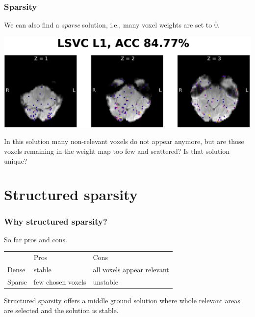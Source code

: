 \documentclass[11pt]{beamer}
\begin{document}
\begin{frame}
    \frametitle{Sparsity}

    We can also find a \emph{sparse} solution, i.e., many voxel weights are set
    to 0.

    \begin{center}
        \includegraphics[scale=0.7]{figures/lsvc_l1-axial.png}
    \end{center}

    In this solution many non-relevant voxels do not appear anymore, but are
    those voxels remaining in the weight map too few and scattered? Is that
    solution unique?

\end{frame}

\section{Structured sparsity}
\label{sec:Structured sparsity}

\begin{frame}
    \frametitle{Why structured sparsity?}

    So far pros and cons.

    \begin{center}
        \begin{tabular}[h]{@{}lll@{}}
            & Pros & Cons \\
            \cmidrule(r){2-3}
            Dense & stable & all voxels appear relevant \\
            Sparse & few chosen voxels & unstable
        \end{tabular}
    \end{center} 
    
    \pause

    Structured sparsity offers a middle ground solution where whole relevant
    areas are selected and the solution is stable.

\end{frame}
\end{document}
